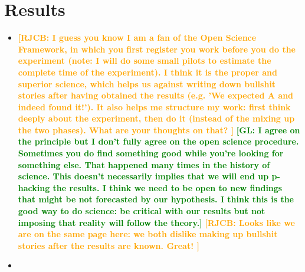 \documentclass{article}
\newcommand*\richel[1]{\textcolor{orange}{\textbf{[RJCB: #1]}}}
\newcommand*\gio[1]{\textcolor{green}{\textbf{[GL: #1]}}}
\begin{document}
\section{Results}
\begin{itemize}

\item
\richel{
  I guess you know I am a fan of the Open Science Framework,
  in which you first register you work before you do the experiment
  (note: I will do some small pilots to estimate the complete time
  of the experiment). I think it is the proper and superior science,
  which helps us against writing down bullshit stories after having
  obtained the results (e.g. 'We expected A and indeed found it!').
  It also helps me structure my work: first think
  deeply about the experiment, then do it (instead of the mixing
  up the two phases). What are your thoughts on that?
}
\gio{I agree on the principle but I don't fully agree on the open science procedure. Sometimes you do find something good while you're looking for something else. That happened many times in the history of science. This doesn't necessarily implies that we will end up p-hacking the results. I think we need to be open to new findings that might be not forecasted by our hypothesis. I think this is the good way to do science: be critical with our results but not imposing that reality will follow the theory.}
\richel{
  Looks like we are on the same page here: we both dislike making up bullshit 
  stories after the results are known. Great!
}
\item

\end{itemize}




\appendix


\end{document}
